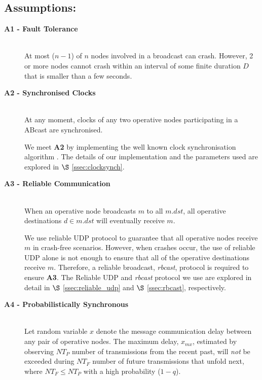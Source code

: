     \subsection*{Assumptions:}	
	\begin{description}	
		\item [\textbf{A1 - Fault Tolerance}] \hfill \\
		At most ($n-1$) of $n$ nodes involved in a broadcast can crash. However, 2 or more nodes cannot crash within an interval of some finite duration $D$ that is smaller than a few seconds.
		
        \item [\textbf{A2 - Synchronised Clocks}] \hfill \\
		At any moment, clocks of any two operative nodes participating in a \textsf{ABcast} are synchronised.  
		
		We meet \textbf{A2} by implementing the well known clock synchronisation algorithm \citep{Cristian:1996:SA:227210.227231}.  The details of our implementation and the parameters used are explored in $\S$ \ref{ssec:clocksynch}.		
		
		\item [\textbf{A3 - Reliable Communication}] \hfill \\
		When an operative node broadcasts $m$ to all $m.dst$, all operative destinations $d \in m.dst$ will eventually receive $m$.  
		
		We use reliable UDP protocol to guarantee that all operative nodes receive $m$ in crash-free scenarios.  However, when crashes occur, the use of reliable UDP alone is not enough to ensure that all of the operative destinations receive $m$.  Therefore, a reliable broadcast, \emph{rbcast}, protocol is required to ensure \textbf{A3}.  The Reliable UDP and \emph{rbcast} protocol we use are explored in detail in $\S$ \ref{ssec:reliable_udp} and $\S$ \ref{ssec:rbcast}, respectively.  
		
		\item [\textbf{A4 - Probabilistically Synchronous}] \hfill \\
        Let random variable $x$ denote the message communication delay between any pair of operative nodes. The maximum delay, $x_{mx}$, estimated by observing $NT_P$ number of transmissions from the recent past, will \emph{not} be exceeded during $NT_F$ number of future transmissions that unfold next, where $NT_F \leq NT_P$ with a high probability ($1 - q$).
		

\end{description}
